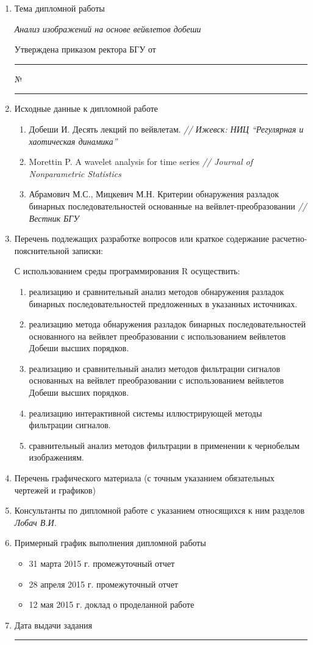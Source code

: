 \documentclass[a4papper,11pt]{report}
\begin{document}
    \begin{enumerate}
    \item Тема дипломной работы

    \textit{Анализ изображений на основе вейвлетов добеши}

    Утверждена приказом ректора БГУ от \rule{2cm}{0.4pt}№\rule{1cm}{0.4pt}

    \item Исходные данные к дипломной работе
        \begin{enumerate}
            \item Добеши И. Десять лекций по вейвлетам. \textit{// Ижевск: НИЦ ``Регулярная и хаотическая динамика''}
            \item Morettin P. A wavelet analysis for time series \textit{// Journal of Nonparametric Statistics}
            \item Абрамович М.С., Мицкевич М.Н. Критерии обнаружения разладок бинарных последовательностей основанные на вейвлет-преобразовании \textit{// Вестник БГУ}
        \end{enumerate}

    \item Перечень подлежащих разработке вопросов или краткое содержание расчетно-пояснительной записки:

        С использованием среды программирования R осуществить:
        \begin{enumerate}
            \item реализацию и сравнительный анализ методов обнаружения разладок бинарных последовательностей предложенных в указанных источниках.
            \item реализацию метода обнаружения разладок бинарных последовательностей основанного на вейвлет преобразовании с использованием вейвлетов Добеши высших порядков.
            \item реализацию и сравнительный анализ методов фильтрации сигналов основанных на вейвлет преобразовании с использованием вейвлетов Добеши высших порядков.
            \item реализацию интерактивной системы иллюстрирующей методы фильтрации сигналов.
            \item сравнительный анализ методов фильтрации в применении к чернобелым изображениям.
        \end{enumerate}
    \item Перечень графического материала (с точным указанием обязательных чертежей и графиков)
    \item Консультанты по дипломной работе с указанием относящихся к ним разделов \textit{Лобач В.И.}
    \item Примерный график выполнения дипломной работы
        \begin{itemize}
            \item 31 марта 2015 г. промежуточный отчет
            \item 28 апреля 2015 г. промежуточный отчет
            \item 12 мая 2015 г. доклад о проделанной работе
        \end{itemize}
    \item Дата выдачи задания \rule{5cm}{0.4pt}


\end{enumerate}
\end{document}
